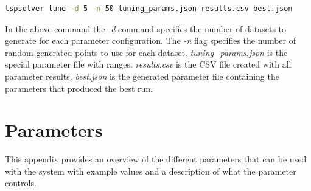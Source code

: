 \documentclass[journal]{IEEEtran}
\begin{document}
\begin{lstlisting}[language=Bash]
tspsolver tune -d 5 -n 50 tuning_params.json results.csv best.json
\end{lstlisting}

In the above command the \textit{-d} command specifies the number of datasets to generate for each parameter configuration. The \textit{-n} flag specifies the number of random generated points to use for each dataset. \textit{tuning\_params.json} is the special parameter file with ranges. \textit{results.csv} is the CSV file created with all parameter results. \textit{best.json} is the generated parameter file containing the parameters that produced the best run.

\section{Parameters}
\label{appendix:parameters}
This appendix provides an overview of the different parameters that can be used with the system with example values and a description of what the parameter controls.
\end{document}
